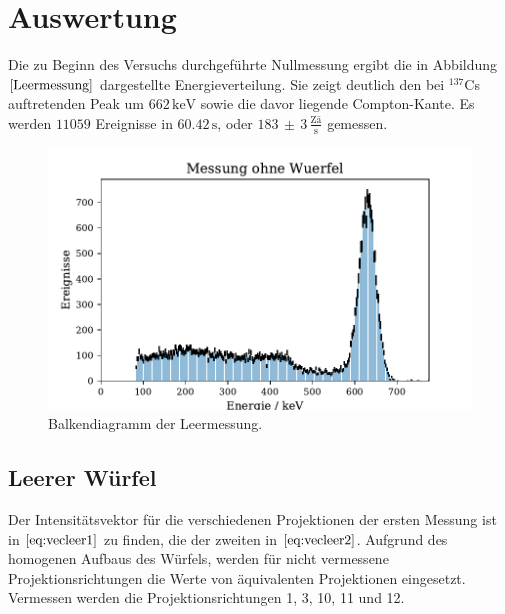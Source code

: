 \section{Auswertung}
Die zu Beginn des Versuchs durchgeführte Nullmessung ergibt die in Abbildung $\ref{Leermessung}$ dargestellte Energieverteilung. Sie zeigt deutlich den bei $^{137}$Cs auftretenden Peak um $662 \, \si{\kilo\electronvolt}$ sowie die davor liegende
Compton-Kante. Es werden $11059$ Ereignisse in $60.42 \, \si{\second}$, oder $183 \,  \pm \, 3\, \frac{\text{Zä}}{\si{\second}}$ gemessen.
\begin{figure}[H]
  \centering
  \includegraphics{plots/leer.pdf}
  \caption{Balkendiagramm der Leermessung.}
  \label{Leermessung}
\end{figure}
\subsection{Leerer Würfel}
Der Intensitätsvektor für die verschiedenen Projektionen der ersten Messung ist in $\ref{eq:vecleer1}$ zu finden, die der zweiten in $\ref{eq:vecleer2}$.
Aufgrund des homogenen Aufbaus des Würfels,
werden für nicht vermessene Projektionsrichtungen die Werte von äquivalenten Projektionen eingesetzt.
Vermessen werden die Projektionsrichtungen 1, 3, 10, 11 und 12.


